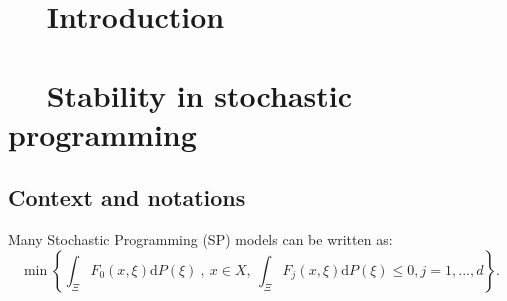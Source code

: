 \documentclass{amsart}
\begin{document}
\tableofcontents

\newpage
\pagestyle{fancy} %
\fancyfoot[R]{\thepage/\pageref{LastPage}} 
\section{$\quad$ Introduction}
\section{$\quad$ Stability in stochastic programming}\label{stability}
\subsection{Context and notations}
Many Stochastic Programming (SP) models can be written as:
\begin{equation}\label{stochastic}
\min\left\{\int_\Xi F_0\left(x,\xi\right)\text{d}P\left(\xi\right)\:,\: x\in X, \: \int_\Xi F_j\left(x,\xi\right)\text{d}P\left(\xi\right)\leq0, j=1,...,d\right\}.
\end{equation}
\end{document}
